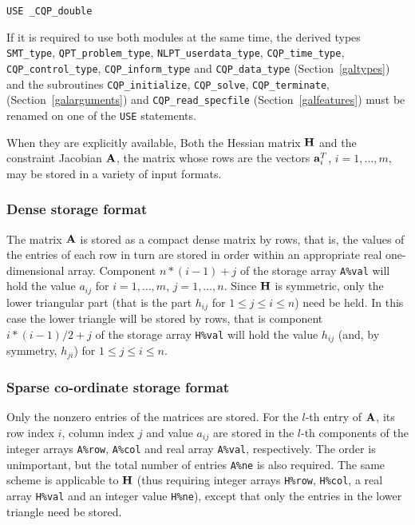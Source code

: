 \documentclass{galahad}
\newcommand{\packagename}{CQP}
\newcommand{\fullpackagename}{\libraryname\_\packagename}
\begin{document}
\medskip{}

\hspace{8mm} {\tt USE  \fullpackagename\_double}

\medskip

\noindent
If it is required to use both modules at the same time, the derived types
{\tt SMT\_type},
{\tt QPT\_problem\_type},
{\tt NLPT\_userdata\-\_type},
{\tt \packagename\_time\_type},
{\tt \packagename\_control\_type},
{\tt \packagename\_inform\_type}
and
{\tt \packagename\_data\_type}
(Section~\ref{galtypes})
and the subroutines
{\tt \packagename\_initialize},
{\tt \packagename\_\-solve},
{\tt \packagename\_terminate},
(Section~\ref{galarguments})
and
{\tt \packagename\_read\_specfile}
(Section~\ref{galfeatures})
must be renamed on one of the {\tt USE} statements.


\galmatrix
When they are explicitly available,
Both the Hessian matrix ${\mathbf{H}}$ and
the constraint Jacobian ${\mathbf{A}}$, the matrix
whose rows are the vectors ${\mathbf{a}}_{i}^{T}$, $i = 1, \ldots , m$,
may be stored in a variety of input formats.

\subsubsection{Dense storage format}\label{dense}
The matrix ${\mathbf{A}}$ is stored as a compact
dense matrix by rows, that is, the values of the entries of each row in turn are
stored in order within an appropriate real one-dimensional array.
Component $n \ast (i-1) + j$ of the storage array {\tt A\%val} will hold the
value $a_{ij}$ for $i = 1, \ldots , m$, $j = 1, \ldots , n$.
Since ${\mathbf{H}}$ is symmetric, only the lower triangular part (that is the part
$h_{ij}$ for $1 \leq j \leq i \leq n$) need be held. In this case
the lower triangle will be stored by rows, that is
component $i \ast (i-1)/2 + j$ of the storage array {\tt H\%val}
will hold the value $h_{ij}$ (and, by symmetry, $h_{ji}$)
for $1 \leq j \leq i \leq n$.

\subsubsection{Sparse co-ordinate storage format}\label{coordinate}
Only the nonzero entries of the matrices are stored. For the
$l$-th entry of ${\mathbf{A}}$, its row index $i$, column index $j$
and value $a_{ij}$
are stored in the $l$-th components of the integer arrays {\tt A\%row},
{\tt A\%col} and real array {\tt A\%val}, respectively.
The order is unimportant, but the total
number of entries {\tt A\%ne} is also required.
The same scheme is applicable to
${\mathbf{H}}$ (thus requiring integer arrays {\tt H\%row}, {\tt H\%col}, a real array
{\tt H\%val} and an integer value {\tt H\%ne}),
except that only the entries in the lower triangle need be stored.
\end{document}
